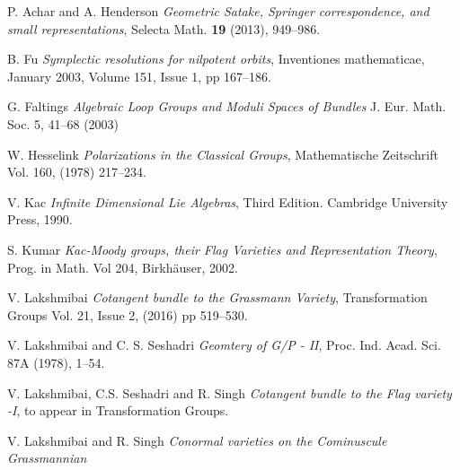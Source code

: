 \documentclass[paper=a4, fontsize=10pt]{amsart} %
\theoremstyle{plain}
\theoremstyle{definition}
\theoremstyle{remark}
\numberwithin{equation}{section} %
\numberwithin{figure}{section} %
\numberwithin{table}{section} %
\numberwithin{subsection}{section} %
\begin{document}
\begingroup
\small
\begin{thebibliography}{1}

 P. Achar and A. Henderson {\it Geometric Satake, Springer correspondence, and small representations}, Selecta Math. {\bf 19} (2013), 949--986.



 B. Fu {\em Symplectic resolutions for nilpotent orbits}, Inventiones mathematicae, January 2003, Volume 151, Issue 1, pp 167--186.

 G. Faltings {\em Algebraic Loop Groups and Moduli Spaces of Bundles} J. Eur. Math. Soc. 5, 41--68 (2003)

  W. Hesselink {\em Polarizations in the Classical Groups}, Mathematische Zeitschrift Vol. 160, (1978) 217--234.

 V. Kac {\em Infinite Dimensional Lie Algebras}, Third Edition. Cambridge University Press, 1990.

 S. Kumar {\em Kac-Moody groups, their Flag Varieties and Representation Theory}, Prog. in Math. Vol 204, Birkh\"auser, 2002.

 V. Lakshmibai {\em Cotangent bundle to the Grassmann Variety}, Transformation Groups Vol. 21, Issue 2, (2016) pp 519--530.



 V. Lakshmibai and C. S. Seshadri {\em Geomtery of G/P - II}, Proc. Ind. Acad. Sci. 87A (1978), 1--54.

 V. Lakshmibai, C.S. Seshadri and R. Singh {\em Cotangent bundle to the Flag variety -I}, to appear in Transformation Groups.

 V. Lakshmibai and R. Singh {\em Conormal varieties on the Cominuscule Grassmannian}


\end{thebibliography}
\end{document}
